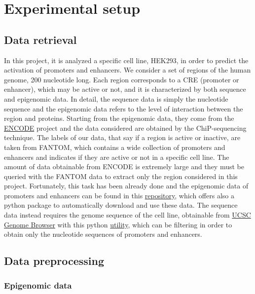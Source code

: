 \section{Experimental setup}

\subsection{Data retrieval}

In this project, it is analyzed a specific cell line, HEK293, in order
to predict the activation of promoters and enhancers. We consider a set
of regions of the human genome, 200 nucleotide long. Each region
corresponds to a CRE (promoter or enhancer), which may be active or not,
and it is characterized by both sequence and epigenomic data. In detail,
the sequence data is simply the nucleotide sequence and the epigenomic
data refers to the level of interaction between the region and proteins.
Starting from the epigenomic data, they come from the
\href{https://www.encodeproject.org/}{ENCODE} project and the data
considered are obtained by the ChiP-sequencing technique. The labels of
our data, that say if a region is active or inactive, are taken from
FANTOM, which contains a wide collection of promoters and enhancers and
indicates if they are active or not in a specific cell line. The amount
of data obtainable from ENCODE is extremely large and they must be
queried with the FANTOM data to extract only the region considered in
this project. Fortunately, this task has been already done and the
epigenomic data of promoters and enhancers can be found in this
\href{https://github.com/LucaCappelletti94/epigenomic_dataset}{repository},
which offers also a python package to automatically download and use
these data. The sequence data instead requires the genome sequence of
the cell line, obtainable from
\href{https://genome.ucsc.edu/index.html}{UCSC Genome Browser} with this
python
\href{https://github.com/LucaCappelletti94/ucsc_genomes_downloader}{utility},
which can be filtering in order to obtain only the nucleotide sequences
of promoters and enhancers.

\subsection{Data preprocessing}

\subsubsection{Epigenomic data}

